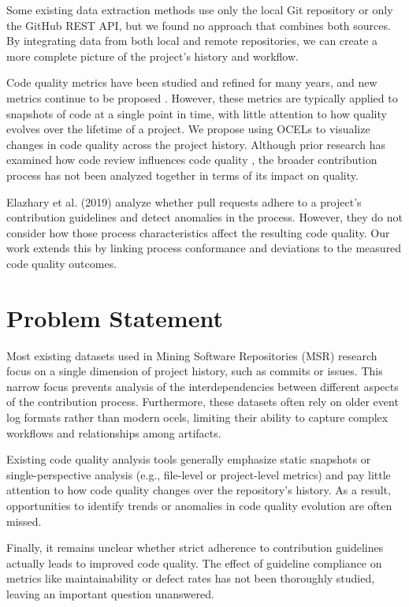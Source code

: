 Some existing data extraction methods use only the local Git repository or only the GitHub REST API, but we found no approach that combines both sources. By integrating data from both local and remote repositories, we can create a more complete picture of the project’s history and workflow.

Code quality metrics have been studied and refined for many years, and new metrics continue to be proposed \autocite{DBLP:journals/smr/CodabuxSC24}. However, these metrics are typically applied to snapshots of code at a single point in time, with little attention to how quality evolves over the lifetime of a project. We propose using OCELs to visualize changes in code quality across the project history. Although prior research has examined how code review influences code quality \autocite{DBLP:journals/ese/McIntoshKAH16}, the broader contribution process has not been analyzed together in terms of its impact on quality.

Elazhary et al. (2019) \autocite{DBLP:conf/icsm/ElazharySEZ19} analyze whether pull requests adhere to a project’s contribution guidelines and detect anomalies in the process. However, they do not consider how those process characteristics affect the resulting code quality. Our work extends this by linking process conformance and deviations to the measured code quality outcomes.

\section{Problem Statement}
Most existing datasets used in Mining Software Repositories (MSR) research focus on a single dimension of project history, such as commits or issues. This narrow focus prevents analysis of the interdependencies between different aspects of the contribution process. Furthermore, these datasets often rely on older event log formats rather than modern \acp{ocel}, limiting their ability to capture complex workflows and relationships among artifacts.

Existing code quality analysis tools generally emphasize static snapshots or single-perspective analysis (e.g., file-level or project-level metrics) and pay little attention to how code quality changes over the repository’s history. As a result, opportunities to identify trends or anomalies in code quality evolution are often missed.

Finally, it remains unclear whether strict adherence to contribution guidelines actually leads to improved code quality. The effect of guideline compliance on metrics like maintainability or defect rates has not been thoroughly studied, leaving an important question unanswered.

